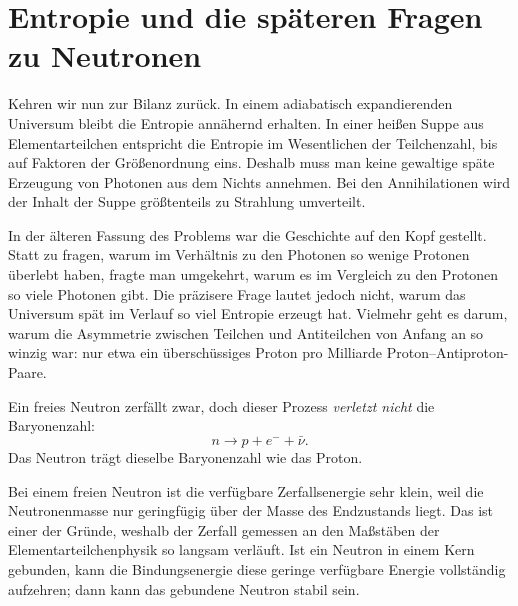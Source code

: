 \section{Entropie und die späteren Fragen zu Neutronen}

Kehren wir nun zur Bilanz zurück. In einem adiabatisch expandierenden Universum bleibt die Entropie annähernd erhalten. In einer heißen Suppe aus Elementarteilchen entspricht die Entropie im Wesentlichen der Teilchenzahl, bis auf Faktoren der Größenordnung eins. Deshalb muss man keine gewaltige späte Erzeugung von Photonen aus dem Nichts annehmen. Bei den Annihilationen wird der Inhalt der Suppe größtenteils zu Strahlung umverteilt.

In der älteren Fassung des Problems war die Geschichte auf den Kopf gestellt. Statt zu fragen, warum im Verhältnis zu den Photonen so wenige Protonen überlebt haben, fragte man umgekehrt, warum es im Vergleich zu den Protonen so viele Photonen gibt. Die präzisere Frage lautet jedoch nicht, warum das Universum spät im Verlauf so viel Entropie erzeugt hat. Vielmehr geht es darum, warum die Asymmetrie zwischen Teilchen und Antiteilchen von Anfang an so winzig war: nur etwa ein überschüssiges Proton pro Milliarde Proton--Antiproton-Paare.

Ein freies Neutron zerfällt zwar, doch dieser Prozess \emph{verletzt nicht} die Baryonenzahl:
\[
n \to p + e^- + \bar\nu.
\]
Das Neutron trägt dieselbe Baryonenzahl wie das Proton.

Bei einem freien Neutron ist die verfügbare Zerfallsenergie sehr klein, weil die Neutronenmasse nur geringfügig über der Masse des Endzustands liegt. Das ist einer der Gründe, weshalb der Zerfall gemessen an den Maßstäben der Elementarteilchenphysik so langsam verläuft. Ist ein Neutron in einem Kern gebunden, kann die Bindungsenergie diese geringe verfügbare Energie vollständig aufzehren; dann kann das gebundene Neutron stabil sein.

\begin{classroomqa}
\end{classroomqa}